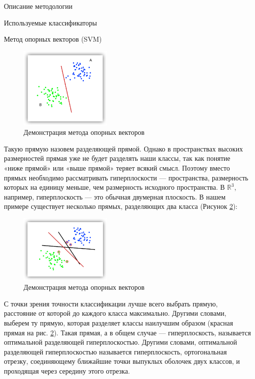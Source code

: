 \begin{section}{Описание методологии}
\begin{subsection}{Используемые классификаторы}
\begin{subsubsection}{Метод опорных векторов (SVM)}
\begin{figure}[ht!]
\centering
\includegraphics[width=0.4\textwidth]{pics/SVM1}
\caption{Демонстрация метода опорных векторов}
\label{pic:SVM1}
\end{figure}

Такую прямую назовем разделяющей прямой. Однако в пространствах высоких размерностей прямая уже не будет разделять наши классы, так как понятие «ниже прямой» или «выше прямой» теряет всякий смысл. Поэтому вместо прямых необходимо рассматривать гиперплоскости — пространства, размерность которых на единицу меньше, чем размерность исходного пространства. В $\mathbb{R}^3$, например, гиперплоскость — это обычная двумерная плоскость.
В нашем примере существует несколько прямых, разделяющих два класса (Рисунок \ref{pic:SVM2}):

\begin{figure}[ht!]
\centering
\includegraphics[width=0.4\textwidth]{pics/SVM2}
\caption{Демонстрация метода опорных векторов}
\label{pic:SVM2}
\end{figure}

С точки зрения точности классификации лучше всего выбрать прямую, расстояние от которой до каждого класса максимально. Другими словами, выберем ту прямую, которая разделяет классы наилучшим образом (красная прямая на рис. \ref{pic:SVM2}). Такая прямая, а в общем случае — гиперплоскость, называется оптимальной разделяющей гиперплоскостью.
Другими словами, оптимальной разделяющей гиперплоскостью называется гиперплоскость, ортогональная отрезку, соединяющему ближайшие точки выпуклых оболочек двух классов, и проходящая через середину этого отрезка.


\end{subsubsection}
\end{subsection}
\end{section}
